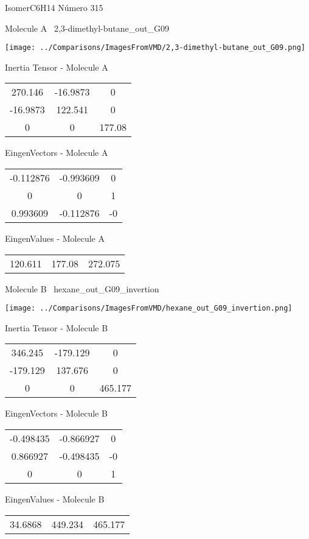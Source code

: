 \vtab[-3cm]
\begin{center}
{\large IsomerC6H14 \tab Número 315}
\end{center}
\begin{multicols}{2}
\begin{center}

Molecule A \
2,3-dimethyl-butane\_out\_G09

\texttt{[image: ../Comparisons/ImagesFromVMD/2,3-dimethyl-butane\_out\_G09.png]}

Inertia Tensor - Molecule A \\
\begin{tabular}{|c c c|}
270.146	 & 	-16.9873	 & 	0	 \\
-16.9873	 & 	122.541	 & 	0	 \\
0	 & 	0	 & 	177.08
\end{tabular}

\vtab
 EingenVectors - Molecule A     \\
\begin{tabular}{|c c c|}
-0.112876	 & 	-0.993609	 & 	0	 \\
0	 & 	0	 & 	1	 \\
0.993609	 & 	-0.112876	 & 	-0
\end{tabular}

\vtab
 EingenValues - Molecule A     \\
\begin{tabular}{|c c c|}
120.611	 & 	177.08	 & 	272.075	 \\
\end{tabular}
\columnbreak

Molecule B \
hexane\_out\_G09\_invertion

\texttt{[image: ../Comparisons/ImagesFromVMD/hexane\_out\_G09\_invertion.png]}

Inertia Tensor - Molecule B \\
\begin{tabular}{|c c c|}
346.245	 & 	-179.129	 & 	0	 \\
-179.129	 & 	137.676	 & 	0	 \\
0	 & 	0	 & 	465.177
\end{tabular}

\vtab
 EingenVectors - Molecule B     \\
\begin{tabular}{|c c c|}
-0.498435	 & 	-0.866927	 & 	0	 \\
0.866927	 & 	-0.498435	 & 	-0	 \\
0	 & 	0	 & 	1
\end{tabular}

\vtab
 EingenValues - Molecule B     \\
\begin{tabular}{|c c c|}
34.6868	 & 	449.234	 & 	465.177	 \\
\end{tabular}

\end{center}
\end{multicols}

